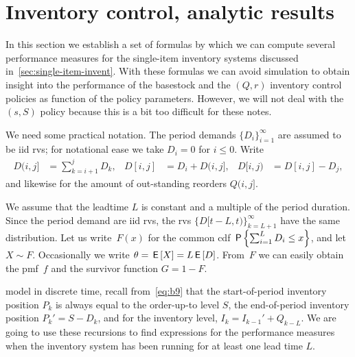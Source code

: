 \documentclass[stochastic-or.tex]{subfiles}
\begin{document}
\section{Inventory control, analytic results}
\label{sec:invent-contr-analyt}

In this section we establish a set of formulas by which we can compute several performance measures for the single-item inventory systems discussed in~\cref{sec:single-item-invent}.
With these formulas we can avoid simulation to obtain insight into the performance of the basestock and the $(Q,r)$ inventory control policies as function of the policy parameters.
However, we will not deal with the $(s,S)$ policy because this is a bit too difficult for these notes.

We need some practical notation.
The period demands $\{D_{i}\}_{i=1}^{\infty}$ are assumed to be iid rvs; for notational ease we take $D_{i} = 0$ for $i\leq 0$.
Write
\begin{align*}
  D(i, j] &= \sum_{k=i+1}^{j} D_k, &   D[i, j] &= D_{i} + D(i, j],  &   D[i, j) &= D[i, j] - D_{j},
\end{align*}
and likewise for the amount of out-standing reorders $Q(i, j]$.


We assume that the leadtime $L$ is constant and a multiple of the period duration.
Since the period demand are iid rvs, the rvs $\{D[t-L, t)\}_{k=L+1}^{\infty}$ have the same distribution.
Let us write~$F(x)$ for the common cdf $\P{\sum_{i=1}^{L} D_{i} \leq x}$, and let $X\sim F$.
Occasionally we write $\theta = \E X = L \E D$.
From~$F$ we can easily obtain the pmf~$f$ and the survivor function $G=1-F$.


 model in discrete time, recall from~\cref{eq:b9} that the start-of-period inventory position $P_{k}$ is always equal to the order-up-to level $S$, the end-of-period inventory position $P_k' = S - D_{k}$, and for the inventory level, $I_{k} = I_{k-1}' + Q_{k-L}$.
We are going to use these recursions to find expressions for the performance measures when the inventory system has been running for at least one lead time $L$.
\end{document}
